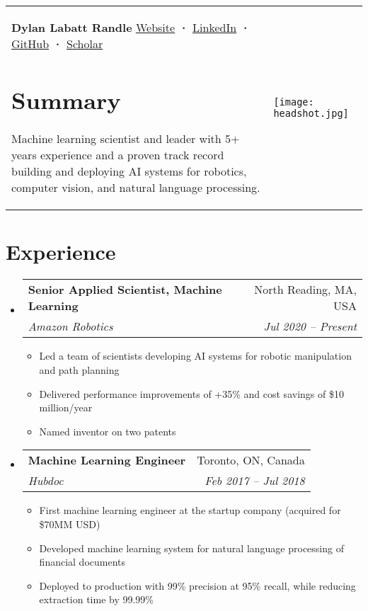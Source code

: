 \documentclass[a4paper,11pt]{article}
\makeatletter
\newcommand{\resumeItem}[1]{
  \item\small{#1}
}
\newcommand{\resumeItemListStart}{\begin{itemize}[rightmargin=0.11in]}
\newcommand{\resumeItemListEnd}{\end{itemize}}
\newcommand{\resumeQuadHeading}[4]{
  \item
  \begin{tabular*}{0.96\textwidth}[t]{l@{\extracolsep{\fill}}r}
    \textbf{#1} & #2 \\
    \textit{\small#3} & \textit{\small #4} \\
  \end{tabular*}
}
\newcommand{\resumeHeadingListStart}{
  \begin{itemize}[leftmargin=0.15in, label={}]
}
\newcommand{\resumeHeadingListEnd}{\end{itemize}}
\makeatother
\begin{document}
\begin{tabularx}{\linewidth}{@{}m{} m{}@{}}
{
    \textbf{\Huge Dylan Labatt Randle \vspace{2pt}} \newline
    \href{https://dylanrandle.github.io/}{\uline{Website}} \textbf{·}
    \href{https://linkedin.com/in/dylanrandle}{\uline{LinkedIn}} \textbf{·}
    \href{https://github.com/dylanrandle}{\uline{GitHub}} \textbf{·}
    \href{https://scholar.google.com/citations?user=62z1l9cAAAAJ}{\uline{Scholar}}
    \section{Summary}
    \small{
      Machine learning scientist and leader with 5+ years experience and a proven track record building and deploying AI systems for robotics, computer vision, and natural language processing.
    }
} & 
{
    \hfill
    \texttt{[image: headshot.jpg]}
}
\end{tabularx}


\section{Experience}
\resumeHeadingListStart{}
  \resumeQuadHeading{Senior Applied Scientist, Machine Learning}{North Reading, MA, USA}
  {Amazon Robotics}{Jul 2020 -- Present}
    \resumeItemListStart{}
      \resumeItem{Led a team of scientists developing AI systems for robotic manipulation and path planning}
      \resumeItem{Delivered performance improvements of +35\% and cost savings of \$10 million/year}
      \resumeItem{Named inventor on two patents}
    \resumeItemListEnd{}
  \resumeQuadHeading{Machine Learning Engineer}{Toronto, ON, Canada}
  {Hubdoc}{Feb 2017 -- Jul 2018}
    \resumeItemListStart{}
        \resumeItem{First machine learning engineer at the startup company (acquired for \$70MM USD)}
        \resumeItem{Developed machine learning system for natural language processing of financial documents}
        \resumeItem{Deployed to production with 99\% precision at 95\% recall, while reducing extraction time by 99.99\%}
    \resumeItemListEnd{}
\resumeHeadingListEnd{}
\end{document}
